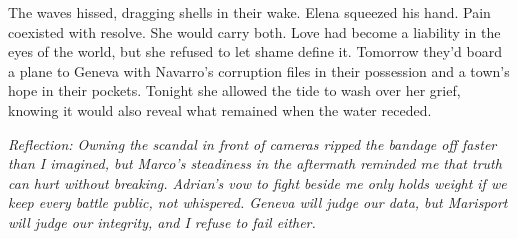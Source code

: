 The waves hissed, dragging shells in their wake. Elena squeezed his hand. Pain coexisted with resolve. She would carry both. Love had become a liability in the eyes of the world, but she refused to let shame define it. Tomorrow they'd board a plane to Geneva with Navarro's corruption files in their possession and a town's hope in their pockets. Tonight she allowed the tide to wash over her grief, knowing it would also reveal what remained when the water receded.


\noindent\textit{Reflection: Owning the scandal in front of cameras ripped the bandage off faster than I imagined, but Marco's steadiness in the aftermath reminded me that truth can hurt without breaking. Adrian's vow to fight beside me only holds weight if we keep every battle public, not whispered. Geneva will judge our data, but Marisport will judge our integrity, and I refuse to fail either.}
